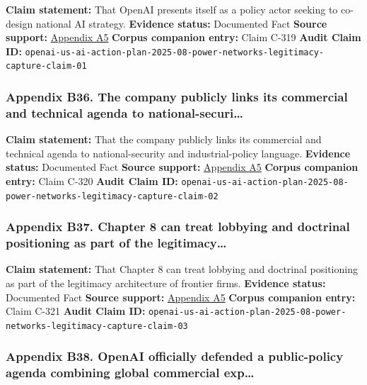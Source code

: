 \documentclass[
  american,
  11pt,
  letterpaper,
]{article}
\begin{document}
\textbf{Claim statement:} That OpenAI presents itself as a policy actor
seeking to co-design national AI strategy. \textbf{Evidence status:}
Documented Fact \textbf{Source support:}
\hyperref[appendix-a5-openais-proposals-for-the-us-ai-action-plan]{Appendix
A5} \textbf{Corpus companion entry:} Claim C-319 \textbf{Audit Claim
ID:}
\texttt{openai-us-ai-action-plan-2025-08-power-networks-legitimacy-capture-claim-01}

\subsubsection{Appendix B36. The company publicly links its commercial
and technical agenda to
national-securi\ldots{}}\label{appendix-b36-the-company-publicly-links-its-commercial-and-technical-agenda-to-national-securi}

\textbf{Claim statement:} That the company publicly links its commercial
and technical agenda to national-security and industrial-policy
language. \textbf{Evidence status:} Documented Fact \textbf{Source
support:}
\hyperref[appendix-a5-openais-proposals-for-the-us-ai-action-plan]{Appendix
A5} \textbf{Corpus companion entry:} Claim C-320 \textbf{Audit Claim
ID:}
\texttt{openai-us-ai-action-plan-2025-08-power-networks-legitimacy-capture-claim-02}

\subsubsection{Appendix B37. Chapter 8 can treat lobbying and doctrinal
positioning as part of the
legitimacy\ldots{}}\label{appendix-b37-chapter-8-can-treat-lobbying-and-doctrinal-positioning-as-part-of-the-legitimacy}

\textbf{Claim statement:} That Chapter 8 can treat lobbying and
doctrinal positioning as part of the legitimacy architecture of frontier
firms. \textbf{Evidence status:} Documented Fact \textbf{Source
support:}
\hyperref[appendix-a5-openais-proposals-for-the-us-ai-action-plan]{Appendix
A5} \textbf{Corpus companion entry:} Claim C-321 \textbf{Audit Claim
ID:}
\texttt{openai-us-ai-action-plan-2025-08-power-networks-legitimacy-capture-claim-03}

\subsubsection{Appendix B38. OpenAI officially defended a public-policy
agenda combining global commercial
exp\ldots{}}\label{appendix-b38-openai-officially-defended-a-public-policy-agenda-combining-global-commercial-exp}
\end{document}
